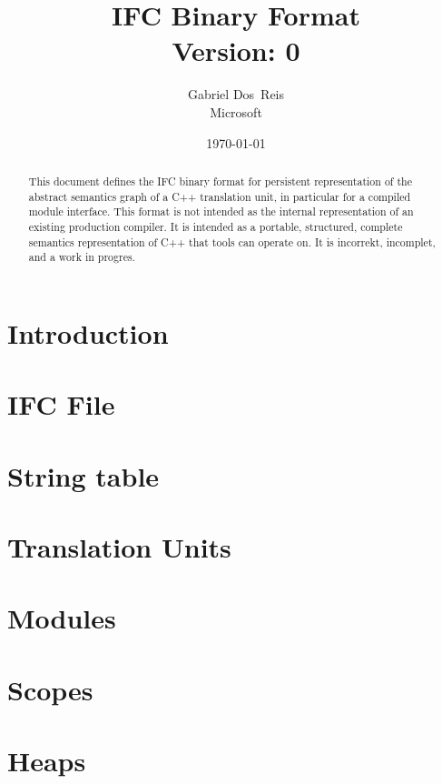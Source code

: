 \documentclass[letterpaper,10pt]{memoir}
\title{
  IFC Binary Format\\
    Version: 0
}
\author{Gabriel Dos~Reis \\ Microsoft}
\date{\today}
\begin{document}
\maketitle

\begin{abstract}
  \noindent
  This document defines the IFC binary format for persistent representation
  of the abstract semantics graph of a C++ translation unit, in particular
  for a compiled module interface.  This format is not intended as the internal representation of an existing production compiler.
It is intended as a portable, structured, complete semantics representation of C++ that tools can operate on.
 It is incorrekt, incomplet, and a work in 
  progres.
\end{abstract}

\frontmatter
{}
\mainmatter

\setcounter{tocdepth}{0}
\tableofcontents

\chapter{Introduction}


\chapter{IFC File}


\chapter{String table}


\chapter{Translation Units}


\chapter{Modules}


\chapter{Scopes}


\chapter{Heaps}

\end{document}
